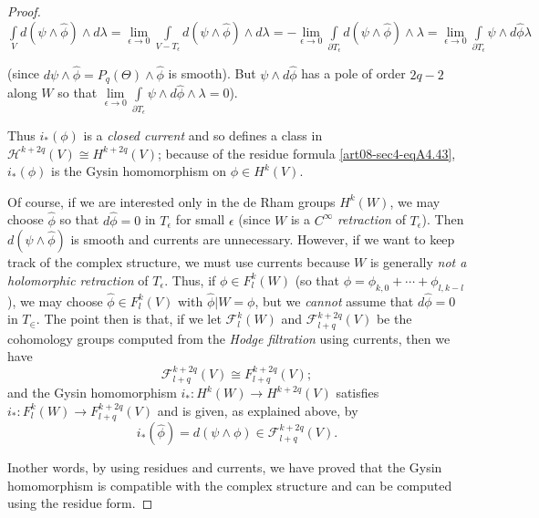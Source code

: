 \begin{proof}
$\int\limits_{V}d(\psi\wedge \widehat{\phi})\wedge d\lambda=\lim\limits_{\epsilon\to 0}\int\limits_{V-T_{\epsilon}}d(\psi \wedge \widehat{\phi})\wedge d\lambda=-\lim\limits_{\epsilon\to 0}\int\limits_{\partial T_{\epsilon}}d(\psi\wedge\widehat{\phi})\wedge \lambda=\lim\limits_{\epsilon\to 0}\int\limits_{\partial T_{\epsilon}}\psi\wedge d\widehat{\phi}\lambda$

(since $d\psi\wedge \widehat{\phi}=P_{q}(\Theta)\wedge \widehat{\phi}$ is smooth). But $\psi\wedge d\widehat{\phi}$ has a pole of order $2q-2$ along $W$ so that $\lim\limits_{\epsilon\to 0}\int\limits_{\partial T_{\epsilon}}\psi\wedge d\widehat{\phi}\wedge\lambda=0$).

Thus $i_{*}(\phi)$ is a {\em closed current} and so defines a class in $\mathscr{H}^{k+2q}(V)\cong H^{k+2q}(V)$; because of the residue formula \eqref{art08-sec4-eqA4.43}, $i_{*}(\phi)$ is the Gysin homomorphism on $\phi\in H^{k}(V)$.

Of course, if we are interested only in the de Rham groups $H^{k}(W)$, we may choose $\widehat{\phi}$ so that $d\widehat{\phi}=0$ in $T_{\epsilon}$ for small $\epsilon$ (since $W$ is a $C^{\infty}$ {\em retraction} of $T_{\epsilon}$). Then $d(\psi\wedge \widehat{\phi})$ is smooth and currents are unnecessary. However, if we want to keep track of the complex structure, we must use currents because $W$ is generally {\em not a holomorphic retraction} of $T_{\epsilon}$. Thus, if $\phi\in F^{k}_{l}(W)$ (so that $\phi=\phi_{k,0}+\cdots+\phi_{l,k-l}$), we may choose $\widehat{\phi}\in F^{k}_{l}(V)$ with $\widehat{\phi}|W=\phi$, but we {\em cannot} assume that $d\widehat{\phi}=0$ in $T_{\in}$. The point then is that, if we let $\mathscr{F}^{k}_{l}(W)$ and $\mathscr{F}^{k+2q}_{l+q}(V)$ be the cohomology groups computed from the {\em Hodge filtration} using currents, then we have
\begin{equation*}
\mathscr{F}^{k+2q}_{l+q}(V)\cong F^{k+2q}_{l+q}(V);\tag{A4.46}\label{art08-sec4-eqA4.46}
\end{equation*}
and the Gysin homomorphism $i_{*}:H^{k}(W)\to H^{k+2q}(V)$ satisfies $i_{*}:F^{k}_{l}(W)\to F^{k+2q}_{l+q}(V)$ and is given, as explained above, by
\begin{equation*}
i_{*}(\widehat{\phi})=d(\psi\wedge \phi)\in \mathscr{F}^{k+2q}_{l+q}(V).\tag{A4.47}\label{art08-sec4-eqA4.47}
\end{equation*}

In\pageoriginale other words, by using residues and currents, we have proved that the Gysin homomorphism is compatible with the complex structure and can be computed using the residue form.
\end{proof}

